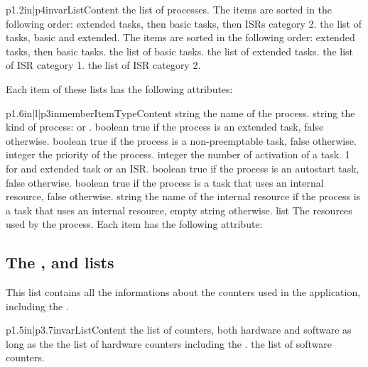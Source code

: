 \begin{longtableii}{p{1.2in}|p{4in}}{var}{List}{Content}
  {the list of processes. The items are sorted in the following order: extended tasks, then basic tasks, then ISRs category 2.}
  {the list of tasks, basic and extended. The items are sorted in the following order: extended tasks, then basic tasks.}
  {the list of basic tasks.}
  {the list of extended tasks.}
  {the list of ISR category 1.}
  {the list of ISR category 2.}
\end{longtableii}

Each item of these lists has the following attributes:

\begin{longtableiii}{p{1.6in}|l|p{3in}}{member}{Item}{Type}{Content}
  {string}
  {the name of the process.}
  {string}
  {the kind of process:  or .}
  {boolean}
  {true if the process is an extended task, false otherwise.}
  {boolean}
  {true if the process is a non-preemptable task, false otherwise.}
  {integer}
  {the priority of the process.}
  {integer}
  {the number of activation of a task. 1 for and extended task or an ISR.}
  {boolean}
  {true if the process is an autostart task, false otherwise.}
  {boolean}
  {true if the process is a task that uses an internal resource, false otherwise.}
  {string}
  {the name of the internal resource if the process is a task that uses an internal resource, empty string otherwise.}
  {list}
  {The resources used by the process. Each item has the following attribute: }
\end{longtableiii}

\subsection{The ,  and  lists}

This list contains all the informations about the counters used in the application, including the .

\begin{longtableii}{p{1.5in}|p{3.7in}}{var}{List}{Content}
  {the list of counters, both hardware and software as long as the }
  {the list of hardware counters including the .}
  {the list of software counters.}
\end{longtableii}

